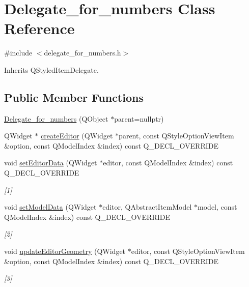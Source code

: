 \hypertarget{classDelegate__for__numbers}{}\section{Delegate\+\_\+for\+\_\+numbers Class Reference}
\label{classDelegate__for__numbers}


{\ttfamily \#include $<$delegate\+\_\+for\+\_\+numbers.\+h$>$}



Inherits Q\+Styled\+Item\+Delegate.

\subsection*{Public Member Functions}
\begin{DoxyCompactItemize}
\item 
\hyperlink{classDelegate__for__numbers_a16e922f8dcb025c5587eb072b189ec9d}{Delegate\+\_\+for\+\_\+numbers} (Q\+Object $\ast$parent=nullptr)
\item 
Q\+Widget $\ast$ \hyperlink{classDelegate__for__numbers_a4b9f325ef5ff87188af3228bf8d29372}{create\+Editor} (Q\+Widget $\ast$parent, const Q\+Style\+Option\+View\+Item \&option, const Q\+Model\+Index \&index) const Q\+\_\+\+D\+E\+C\+L\+\_\+\+O\+V\+E\+R\+R\+I\+DE
\item 
void \hyperlink{classDelegate__for__numbers_a182eaf8c7d3306a22415315fe53577d3}{set\+Editor\+Data} (Q\+Widget $\ast$editor, const Q\+Model\+Index \&index) const Q\+\_\+\+D\+E\+C\+L\+\_\+\+O\+V\+E\+R\+R\+I\+DE
\begin{DoxyCompactList}\small\item\em \mbox{[}1\mbox{]} \end{DoxyCompactList}\item 
void \hyperlink{classDelegate__for__numbers_a99f27c00eea2aa04248cb3410a9557de}{set\+Model\+Data} (Q\+Widget $\ast$editor, Q\+Abstract\+Item\+Model $\ast$model, const Q\+Model\+Index \&index) const Q\+\_\+\+D\+E\+C\+L\+\_\+\+O\+V\+E\+R\+R\+I\+DE
\begin{DoxyCompactList}\small\item\em \mbox{[}2\mbox{]} \end{DoxyCompactList}\item 
void \hyperlink{classDelegate__for__numbers_aa8c3d2a65f804ee47df6b938f834c9ca}{update\+Editor\+Geometry} (Q\+Widget $\ast$editor, const Q\+Style\+Option\+View\+Item \&option, const Q\+Model\+Index \&index) const Q\+\_\+\+D\+E\+C\+L\+\_\+\+O\+V\+E\+R\+R\+I\+DE
\begin{DoxyCompactList}\small\item\em \mbox{[}3\mbox{]} \end{DoxyCompactList}\end{DoxyCompactItemize}


